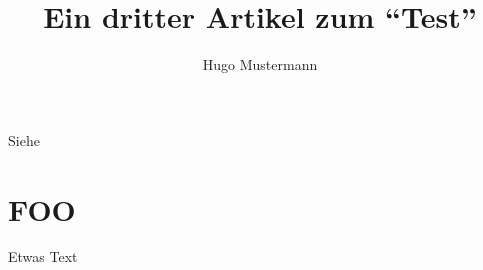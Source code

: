 \documentclass{dtk2}
\author{Hugo Mustermann}
\begin{document}
\title{Ein dritter Artikel zum "`Test"'}

\maketitle
\nocite{*}
Siehe~\cite{knuth:ct:a}

\section{FOO}

Etwas Text \clearpage

\printbibliography
\end{document}
